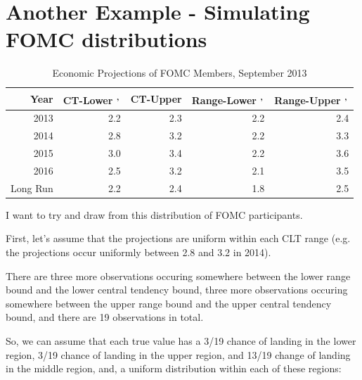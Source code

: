 \documentclass[11pt]{article}
\begin{document}
\section{Another Example - Simulating FOMC distributions}
\label{sec-2}

\begin{table}[htb]
\caption{\label{GDPProjections}Economic Projections of FOMC Members, September 2013}
\begin{tabular}{rrrrr}
Year & CT-Lower \footnotemark \textsuperscript{,}\,\footnotemark & CT-Upper \footnotemark[6]{} & Range-Lower \footnotemark[6]{} \textsuperscript{,}\,\footnotemark & Range-Upper \footnotemark[6]{} \textsuperscript{,}\,\footnotemark[8]{}\\
\hline
2013 & 2.2 & 2.3 & 2.2 & 2.4\\
2014 & 2.8 & 3.2 & 2.2 & 3.3\\
2015 & 3.0 & 3.4 & 2.2 & 3.6\\
2016 & 2.5 & 3.2 & 2.1 & 3.5\\
Long Run & 2.2 & 2.4 & 1.8 & 2.5\\
\end{tabular}
\end{table}

I want to try and draw from this distribution of FOMC participants.

First, let's assume that the projections are uniform within each CLT range (e.g. the projections occur uniformly between 2.8 and 3.2 in 2014).

There are three more observations occuring somewhere between the lower range bound and the lower central tendency bound, three more observations occuring somewhere between the upper range bound and the upper central tendency bound, and there are 19 observations in total.

So, we can assume that each true value has a 3/19 chance of landing in the lower region, 3/19 chance of landing in the upper region, and 13/19 change of landing in the middle region, and, a uniform distribution within each of these regions:
\end{document}
